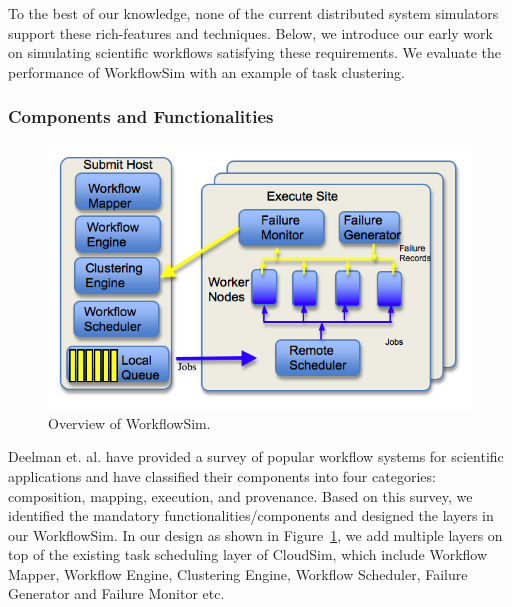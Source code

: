 To the best of our knowledge, none of the current distributed system simulators support these rich-features and techniques. Below, we introduce our early work on simulating scientific workflows satisfying these requirements. We evaluate the performance of WorkflowSim with an example of task clustering. 

\subsubsection{Components and Functionalities}

\begin{figure}[!htb]
	\centering
	\includegraphics[width=0.6\linewidth]{figures/workflowsim/wfs_overview.png}
	\caption{Overview of WorkflowSim.}
	\label{fig:model_wfs}
\end{figure}

Deelman et. al. \cite{Deelman2009} have provided a survey of popular workflow systems for scientific applications and have classified their components into four categories: composition, mapping, execution, and provenance. Based on this survey, we identified the mandatory functionalities/components and designed the layers in our WorkflowSim. In our design as shown in Figure~\ref{fig:model_wfs}, we add multiple layers on top of the existing task scheduling layer of CloudSim, which include Workflow Mapper, Workflow Engine, Clustering Engine, Workflow Scheduler, Failure Generator and Failure Monitor etc. 

